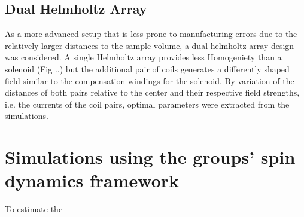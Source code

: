         \subsection{Dual Helmholtz Array}\label{simulations:DualHelmholtzArray}
        As a more advanced setup that is less prone to manufacturing errors due to the relatively larger distances to the sample volume, a dual helmholtz array design was considered. A single Helmholtz array provides less Homogeniety than a solenoid (Fig ..) but the additional pair of coils generates a differently shaped field similar to the compensation windings for the solenoid. By variation of the distances of both pairs relative to the center and their respective field strengths, i.e. the currents of the coil pairs, optimal parameters were extracted from the simulations. 
    \section{Simulations using the groups' spin dynamics framework}
        To estimate the 
